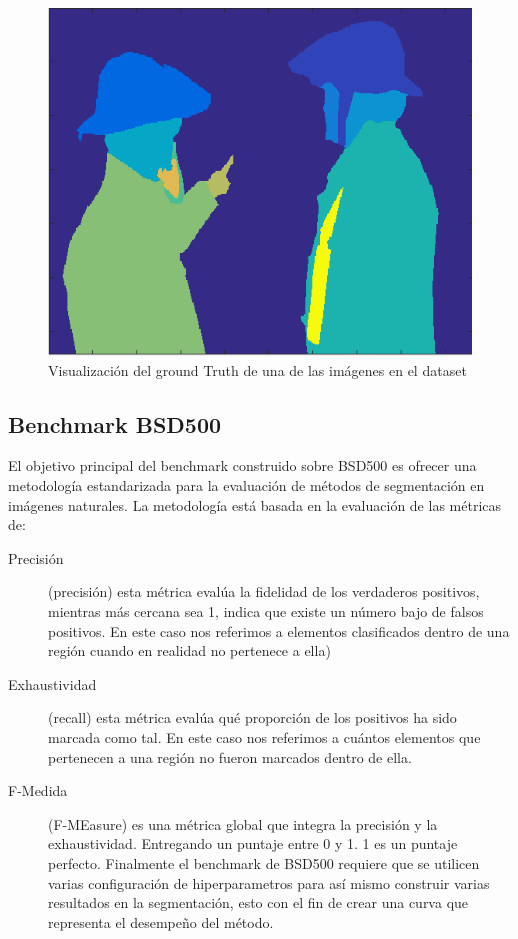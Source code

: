 \documentclass[10pt,twocolumn,letterpaper]{article}
\begin{document}
\begin{figure}

\includegraphics[width=0.85\linewidth]
                 {img/Imagesc.png}
 \caption{Visualización del ground Truth de una de las imágenes en el dataset}
\label{fig:short2}
\end{figure}

\subsection{Benchmark  BSD500}
El objetivo principal del benchmark construido sobre BSD500 es ofrecer una metodología estandarizada para la evaluación de métodos de segmentación en imágenes naturales. La metodología está basada en la evaluación de las métricas de:
\begin{description}


\item[Precisión] (precisión) esta métrica evalúa la fidelidad de los verdaderos positivos, mientras más cercana sea 1, indica que existe un número bajo de falsos positivos. En este caso nos referimos a elementos clasificados dentro de una región cuando en realidad no pertenece a ella)

\item[Exhaustividad] (recall) esta métrica evalúa qué proporción  de los positivos ha sido marcada como tal. En este caso nos referimos a cuántos elementos que pertenecen a una región no fueron marcados dentro de ella.

\item[F-Medida] (F-MEasure)  es una métrica global que integra la precisión y la exhaustividad. Entregando un puntaje entre 0 y 1. 1 es un puntaje perfecto.
Finalmente el benchmark de BSD500 requiere que se utilicen varias configuración de hiperparametros para así mismo construir varias resultados en la segmentación,  esto con el fin de crear una curva que representa el desempeño del método.
\end{description}
\end{document}
